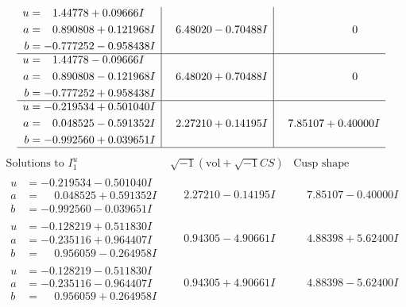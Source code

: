 \documentclass[1p]{elsarticle_modified}
\theoremstyle{definition}
\newcommand{\I}{\sqrt{-1}}
\begin{document}
$$\begin{array}{c|c|c}
\begin{aligned}
u &= \phantom{-}1.44778 + 0.09666 I \\
a &= \phantom{-}0.890808 + 0.121968 I \\
b &= -0.777252 - 0.958438 I\end{aligned}
 & \phantom{-}6.48020 - 0.70488 I & \phantom{-0.000000 } 0 \\ \hline\begin{aligned}
u &= \phantom{-}1.44778 - 0.09666 I \\
a &= \phantom{-}0.890808 - 0.121968 I \\
b &= -0.777252 + 0.958438 I\end{aligned}
 & \phantom{-}6.48020 + 0.70488 I & \phantom{-0.000000 } 0 \\ \hline\begin{aligned}
u &= -0.219534 + 0.501040 I \\
a &= \phantom{-}0.048525 - 0.591352 I \\
b &= -0.992560 + 0.039651 I\end{aligned}
 & \phantom{-}2.27210 + 0.14195 I & \phantom{-}7.85107 + 0.40000 I\\
 \hline 
 \end{array}$$\newpage$$\begin{array}{c|c|c}  
\text{Solutions to }I^u_{1}& \I (\text{vol} + \sqrt{-1}CS) & \text{Cusp shape}\\
 \hline 
\begin{aligned}
u &= -0.219534 - 0.501040 I \\
a &= \phantom{-}0.048525 + 0.591352 I \\
b &= -0.992560 - 0.039651 I\end{aligned}
 & \phantom{-}2.27210 - 0.14195 I & \phantom{-}7.85107 - 0.40000 I \\ \hline\begin{aligned}
u &= -0.128219 + 0.511830 I \\
a &= -0.235116 + 0.964407 I \\
b &= \phantom{-}0.956059 - 0.264958 I\end{aligned}
 & \phantom{-}0.94305 - 4.90661 I & \phantom{-}4.88398 + 5.62400 I \\ \hline\begin{aligned}
u &= -0.128219 - 0.511830 I \\
a &= -0.235116 - 0.964407 I \\
b &= \phantom{-}0.956059 + 0.264958 I\end{aligned}
 & \phantom{-}0.94305 + 4.90661 I & \phantom{-}4.88398 - 5.62400 I \\ \hline\begin{aligned}

\end{aligned}
\end{array}$$
\end{document}
